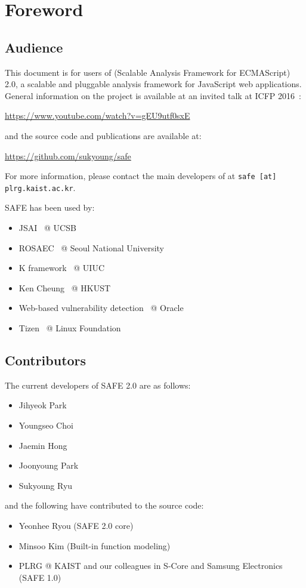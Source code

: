 \chapter{Foreword}
\label{c:1:foreword}

\section{Audience}
This document is for users of \safe (Scalable Analysis Framework for ECMAScript)
2.0, a scalable and pluggable analysis framework for JavaScript web applications.
General information on the \safe project is available at an invited talk at ICFP 2016~\cite{safeicfp16}:
\begin{center}
  \url{https://www.youtube.com/watch?v=gEU9utf0sxE}
\end{center}
and the source code and publications are available at:
\begin{center}
  \url{https://github.com/sukyoung/safe}
\end{center}
For more information, please contact the main developers of \safe
at \texttt{safe [at] plrg.kaist.ac.kr}.

SAFE has been used by:
\begin{itemize}
\itemsep-.1em
\item JSAI~\cite{jsai} @ UCSB
\item ROSAEC~\cite{rosaec} @ Seoul National University
\item K framework~\cite{kjs} @ UIUC
\item Ken Cheung~\cite{emse16} @ HKUST
\item Web-based vulnerability detection~\cite{oracle} @ Oracle
\item Tizen~\cite{tizen} @ Linux Foundation
\end{itemize}

\section{Contributors}
The current developers of SAFE 2.0 are as follows:
\begin{itemize}
\itemsep-.1em
\item Jihyeok Park
\item Youngseo Choi
\item Jaemin Hong
\item Joonyoung Park
\item Sukyoung Ryu
\end{itemize}
and the following have contributed to the source code:
\begin{itemize}
\itemsep-.1em
\item Yeonhee Ryou (SAFE 2.0 core)
\item Minsoo Kim (Built-in function modeling)
\item PLRG @ KAIST and our colleagues in S-Core and Samsung Electronics (SAFE 1.0)
\end{itemize}


